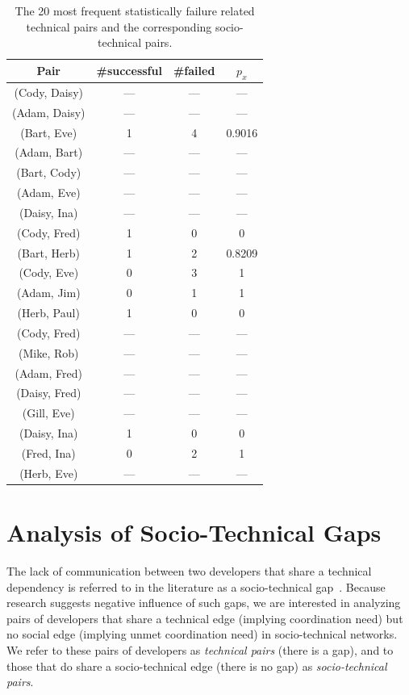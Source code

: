 \begin{table}[t]
\centering
\begin{tabular}{@{\hspace{.2cm}}ccc@{\hspace{.75cm}}c@{\hspace{.2cm}}}
\toprule
Pair & \#successful & \#failed & $p_x$ \\
\midrule
(Cody, Daisy)	&	---&	---&	---\\
(Adam, Daisy)	&	---&	---&	---\\
(Bart, Eve)	&	1&	4&	0.9016\\
(Adam, Bart)	&	---&	---&	---\\
(Bart, Cody)	&	---&	---&	---\\
(Adam, Eve)	&	---&	---&	---\\
(Daisy, Ina)	&	---&	---&	---\\
(Cody, Fred)	&	1&	0&	0\\
(Bart, Herb)	&	1&	2&	0.8209\\
(Cody, Eve)	&	0&	3&	1\\
(Adam, Jim)	&	0&	1&	1\\
(Herb, Paul)	&	1&	0&	0\\
(Cody, Fred)	&	---&	---&	---\\
(Mike, Rob)	&	---&	---&	---\\
(Adam, Fred)	&	---&	---&	---\\
(Daisy, Fred)	&	---&	---&	---\\
(Gill, Eve)		&	---&	---&	---\\
(Daisy, Ina)	&	1&	0&	0\\
(Fred, Ina)	&	0&	2&	1\\
(Herb, Eve)	&	---&	---&	---\\
\bottomrule
\end{tabular}
\caption{The 20 most frequent statistically failure related technical pairs and the corresponding socio-technical pairs.}
\label{tab:stechpairs}
\end{table}


\section{Analysis of Socio-Technical Gaps}
\label{ch8:gaps}
The lack of communication between two developers that share a
technical dependency is referred to in the literature as a
socio-technical gap~\cite{valetto:msr:2007}. Because research suggests negative influence of such gaps, we are interested in analyzing pairs of developers that share a technical edge (implying coordination need) but no social edge (implying
unmet coordination need) in socio-technical networks. We refer to these pairs of
developers as \emph{technical pairs} (there is a gap), and to those that do
share a socio-technical edge (there is no gap) as \emph{socio-technical pairs}. 

